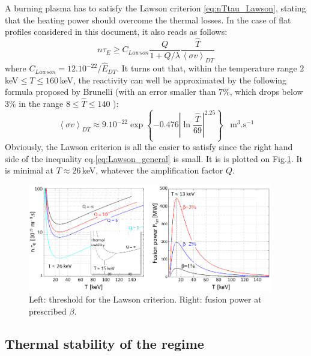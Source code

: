 A burning plasma has to satisfy the Lawson criterion \ref{eq:nTtau_Lawson}, stating that the heating power should overcome the thermal losses. In the case of flat profiles considered in this document, it also reads as follows:
\begin{equation}
 \label{eq:Lawson_general}
 n\tau_E \geq C_{Lawson} 
 \frac{Q}{1+Q/\lambda}
 \frac{\hat T}{\left< \sigma v \right>_{DT}}
\end{equation}
where $C_{Lawson} = 12.10^{-22}/\hat E_{DT}$. It turns out that, within the temperature range $2\,$keV$\leq T \leq 160\,$keV, the reactivity can well be approximated by the following formula proposed by Brunelli (with an error smaller than $7\%$, which drops below $3\%$ in the range $8\leq \hat T \leq 140$ ):
\begin{equation}
  \left< \sigma v \right>_{DT} \approx 9.10^{-22}
  \exp\left\{ -0.476 \left| \ln\frac{\hat T}{69} \right|^{2.25}\right\}
  \;\;\;\textrm{m}^3.\textrm{s}^{-1}
\end{equation}
Obviously, the Lawson criterion is all the easier to satisfy since the right hand side of the inequality eq.\ref{eq:Lawson_general} is small. It is is plotted on Fig.\ref{fig:ntauE_Pfus_Tchoice}. It is minimal at $T\approx 26\,$keV, whatever the amplification factor $Q$.

\begin{figure} 
	\begin{center}
		\includegraphics[width=0.95\textwidth]{figures/Fig_ntauE_Pfus_Tchoice_v3.png}
		\caption{Left: threshold for the Lawson criterion. Right: fusion power at prescribed $\beta$.}
		\label{fig:ntauE_Pfus_Tchoice}
	\end{center}
\end{figure}


\subsection{Thermal stability of the regime}\label{sec:thermal_stability}

